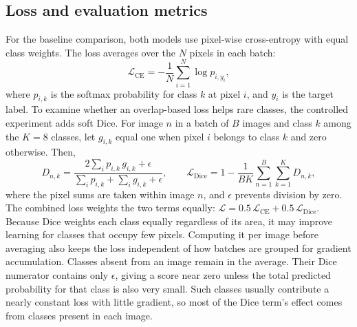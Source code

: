 \subsection{Loss and evaluation metrics}
\label{sec:metrics}
For the baseline comparison, both models use pixel-wise cross-entropy with
equal class weights. The loss averages over the $N$ pixels in each batch:
\begin{equation}
\mathcal{L}_{\mathrm{CE}}=-\frac{1}{N}\sum_{i=1}^{N}\log p_{i,y_i},
\end{equation}
where $p_{i,k}$ is the softmax probability for class $k$ at pixel $i$, and $y_i$
is the target label. To examine whether an overlap-based loss helps rare
classes, the controlled experiment adds soft Dice. For image $n$ in a batch of
$B$ images and class $k$ among the $K=8$ classes, let $g_{i,k}$ equal one when
pixel $i$ belongs to class $k$ and zero otherwise. Then,
\begin{equation}
D_{n,k}=\frac{2\sum_{i}p_{i,k}\,g_{i,k}+\epsilon}{\sum_{i}p_{i,k}+\sum_{i}g_{i,k}+\epsilon},
\qquad
\mathcal{L}_{\mathrm{Dice}}=1-\frac{1}{BK}\sum_{n=1}^{B}\sum_{k=1}^{K}D_{n,k},
\end{equation}
where the pixel sums are taken within image $n$, and $\epsilon$ prevents
division by zero. The combined loss weights the two terms equally:
$\mathcal{L}=0.5\,\mathcal{L}_{\mathrm{CE}}+0.5\,\mathcal{L}_{\mathrm{Dice}}$.
Because Dice weights each class equally regardless of its area, it may improve
learning for classes that occupy few pixels. Computing it per image before
averaging also keeps the loss independent of how batches are grouped for
gradient accumulation. Classes absent from an image remain in the average.
Their Dice numerator contains only $\epsilon$, giving a score near zero unless
the total predicted probability for that class is also very small. Such classes
usually contribute a nearly constant loss with little gradient, so most of the
Dice term's effect comes from classes present in each image.

